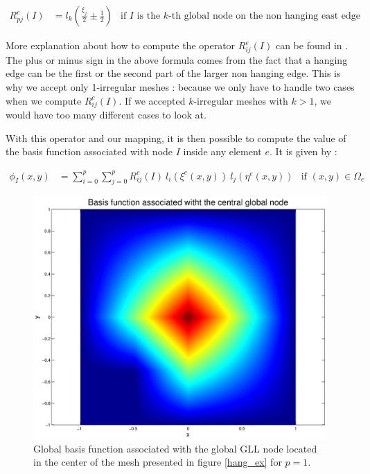\begin{align*}
R^e_{pj}(I) &= l_k \left(\frac{\xi_j}{2}\pm \frac{1}{2}\right) &\text{if $I$ is the $k$-th global node on the non hanging east edge}
\end{align*} 

More explanation about how to compute the operator $R^e_{ij}(I)$ can be found in \cite{hang_handle}. The plus or minus sign in the above formula comes from the fact that a hanging edge can be the first or the second part of the larger non hanging edge. This is why we accept only 1-irregular meshes : because we only have to handle two cases when we compute $R^e_{ij}(I)$. If we accepted $k$-irregular meshes with $k>1$, we would have too many different cases to look at. 

With this operator and our mapping, it is then possible to compute the value of the basis function associated with node $I$ inside any element $e$. It is given by : 

\begin{align}
\phi_I(x,y) &= \sum_{i=0}^p\sum_{j=0}^p R^e_{ij}(I) \: l_i(\xi^e(x,y))\: l_j(\eta^e(x,y)) &\text{if $(x,y) \in \Omega_e$}\label{eq:global_basis}
\end{align}

\begin{figure}
\centering
\includegraphics[scale=0.35]{Theory/global_basis_func.eps}
\caption{Global basis function associated with the global GLL node located in the center of the mesh presented in figure \ref{hang_ex} for $p=1$.}
\label{global_basis_func}
\end{figure}


